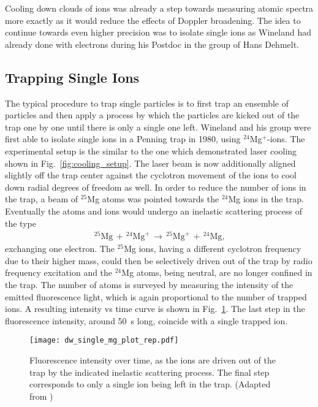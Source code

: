 Cooling down clouds of ions was already a step towards measuring atomic spectra
more exactly as it would reduce the effects of Doppler broadening. The idea to
continue towards even higher precision was to isolate single ions as Wineland
had already done with electrons during his Postdoc in the group of Hans Dehmelt.


\subsection{Trapping Single Ions}
The typical procedure to trap single particles is to first trap an ensemble of
particles and then apply a process by which the particles are kicked out of the
trap one by one until there is only a single one left. Wineland and his group
were first able to isolate single ions in a Penning trap in 1980, using 
$^{24}$Mg$^+$-ions. The experimental setup is the similar to the one which
demonstrated
laser cooling shown in Fig.~\ref{fig:cooling_setup}. The laser beam is now
additionally aligned slightly off the trap center against the cyclotron movement
of the ions to cool down radial degrees of freedom as well. In order to reduce the
number of ions in the trap, a beam of $^{25}$Mg atoms was pointed towards the
$^{24}$Mg ions in the trap. Eventually the atoms and ions would undergo an
inelastic scattering process of the type
\begin{align}
  \label{eq:inel_scat}
  \,^{25}\text{Mg}\, + \,^{24}\text{Mg}^+ \,\longrightarrow\, ^{25}\text{Mg}^+ \,+
  \,^{24}\text{Mg},
\end{align}
exchanging one electron. The $^{25}$Mg ions, having a different cyclotron
frequency due to their higher mass, could then be selectively driven out of the
trap by radio frequency excitation and the $^{24}$Mg atoms, being neutral, are
no longer confined in the trap. The number of atoms is surveyed by measuring the
intensity of the emitted fluorescence light, which is again proportional to the
number of trapped ions. A resulting intensity vs time curve is shown in
Fig.~\ref{fig:dw_single_mg_plot_rep}. The last step in the fluorescence
intensity, around \SI{50}{\second} long, coincide with a single trapped ion.
\begin{figure}[t]
  \centering
  \texttt{[image: dw\_single\_mg\_plot\_rep.pdf]}
  \caption{Fluorescence intensity over time, as the ions are driven out of the
  trap by the indicated inelastic scattering process. The final step corresponds
  to only a single ion being left in the trap. (Adapted from
  \cite{wineland1981spectroscopy})}
  \label{fig:dw_single_mg_plot_rep}
\end{figure}

